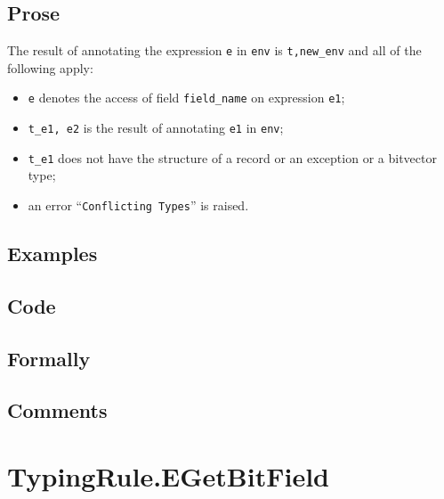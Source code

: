 \documentclass{book}
\begin{document}
 \subsection{Prose}
  The result of annotating the expression \texttt{e} in \texttt{env} is
\texttt{t,new\_env} and all of the following apply:
   \begin{itemize}
   \item \texttt{e} denotes the access of field \texttt{field\_name} on expression \texttt{e1};
   \item \texttt{t\_e1, e2} is the result of annotating \texttt{e1} in \texttt{env};
   \item \texttt{t\_e1} does not have the structure of a record or an exception or a bitvector type;
   \item an error ``\texttt{Conflicting Types}'' is raised.
   \end{itemize}

 \subsection{Examples}

 \subsection{Code}

 \subsection{Formally}

 \subsection{Comments}

\section{TypingRule.EGetBitField \label{sec:TypingRule.EGetBitField}}
\end{document}
